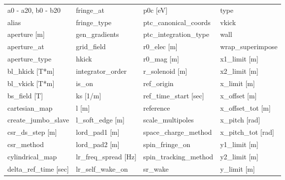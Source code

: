  \begin{tabular}{llll} \toprule
a0 - a20, b0 - b20               & fringe_at                        & p0c [eV]                         & type                             \\
alias                            & fringe_type                      & ptc_canonical_coords             & vkick                            \\
aperture [m]                     & gen_gradients                    & ptc_integration_type             & wall                             \\
aperture_at                      & grid_field                       & r0_elec [m]                      & wrap_superimpose                 \\
aperture_type                    & hkick                            & r0_mag [m]                       & x1_limit [m]                     \\
bl_hkick [T*m]                   & integrator_order                 & r_solenoid [m]                   & x2_limit [m]                     \\
bl_vkick [T*m]                   & is_on                            & ref_origin                       & x_limit [m]                      \\
bs_field [T]                     & ks [1/m]                         & ref_time_start [sec]             & x_offset [m]                     \\
cartesian_map                    & l [m]                            & reference                        & x_offset_tot [m]                 \\
create_jumbo_slave               & l_soft_edge [m]                  & scale_multipoles                 & x_pitch [rad]                    \\
csr_ds_step [m]                  & lord_pad1 [m]                    & space_charge_method              & x_pitch_tot [rad]                \\
csr_method                       & lord_pad2 [m]                    & spin_fringe_on                   & y1_limit [m]                     \\
cylindrical_map                  & lr_freq_spread [Hz]              & spin_tracking_method             & y2_limit [m]                     \\
delta_ref_time [sec]             & lr_self_wake_on                  & sr_wake                          & y_limit [m]                      \\

\end{tabular}
